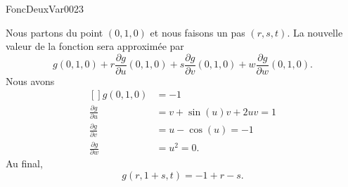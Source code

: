 
\begin{corrige}{FoncDeuxVar0023}

	Nous partons du point $(0,1,0)$ et nous faisons un pas $(r,s,t)$. La nouvelle valeur de la fonction sera approximée par
	\begin{equation}
		g(0,1,0)+r\frac{ \partial g }{ \partial u }(0,1,0)+s\frac{ \partial g }{ \partial v }(0,1,0)+w\frac{ \partial g }{ \partial w }(0,1,0).
	\end{equation}
	Nous avons
	\begin{equation}
		\begin{aligned}[]
			g(0,1,0)&=-1\\
			\frac{ \partial g }{ \partial u }&=v+\sin(u)v+2uv=1\\
			\frac{ \partial g }{ \partial v }&=u-\cos(u)=-1\\
			\frac{ \partial g }{ \partial w }&=u^2=0.
		\end{aligned}
	\end{equation}
	Au final,
	\begin{equation}
		g(r,1+s,t)=-1+r-s.
	\end{equation}

\end{corrige}

